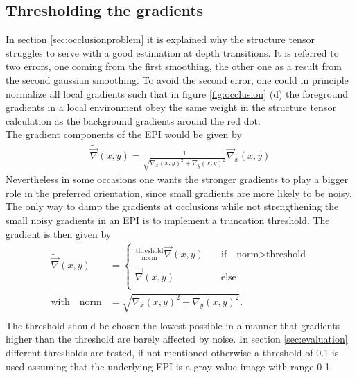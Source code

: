 \documentclass  [
  paper    = a4,
  BCOR     = 10mm,
  twoside,
  fontsize = 12pt,
  fleqn,
  toc      = bibnumbered,
  toc      = listofnumbered,
  numbers  = noendperiod,
  headings = normal,
  listof   = leveldown,
  version  = 3.03
]                                       {scrreprt}
\begin{document}
 \subsection{Thresholding the gradients}
 \label{sec:thresholdinggradients}
 In section \ref{sec:occlusionproblem} it is explained why the structure tensor struggles to serve with a  good estimation at depth transitions. It is referred to two errors, one coming from the first smoothing, the other one as a result from the second gaussian smoothing. To avoid the second error, one could in principle normalize all local gradients such that in figure \ref{fig:occlusion} (d) the foreground gradients in a local environment obey the same weight in the structure tensor calculation as the background gradients around the red dot.\\
 The gradient components of the EPI would be given by
 \begin{align}
 	\tilde{\vec \nabla}(x,y) = \frac{1}{\sqrt{\nabla_x(x,y)^2 + \nabla_y(x,y)^2}} \vec \nabla_x(x,y)
 \end{align}
 Nevertheless in some occasions one wants the stronger gradients to play a bigger role in the preferred orientation, since small gradients are more likely to be noisy. The only way to damp the gradients at occlusions while not strengthening the small noisy gradients in an EPI is to implement a truncation threshold. The gradient is then given by
 \begin{align}
 \tilde{\vec \nabla}(x,y) &= \begin{cases}
\frac{\text{threshold}}{\text{norm}} \vec \nabla(x,y) \quad &\text{if}\quad \text{norm}> \text{threshold}\\
\tilde{\vec \nabla}(x,y)\qquad &\text{else}\\
 \end{cases} \\
\text{with} \quad \text{norm} &= \sqrt{\nabla_x(x,y)^2 + \nabla_y(x,y)^2}.\\
 \end{align}
 The threshold should be chosen the lowest possible in a manner that gradients higher than the threshold are barely affected by noise. In section \ref{sec:evaluation} different thresholds are tested, if not mentioned otherwise a threshold of 0.1 is used assuming that the underlying EPI is a gray-value image with range 0-1.\\
 
\end{document}
